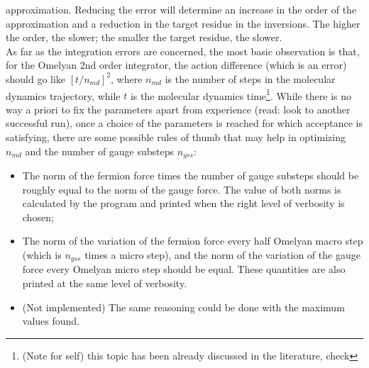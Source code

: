 approximation. 
Reducing the error will determine an increase in the order of the approximation 
and a 
reduction in the target residue in the inversions. The higher the order, the 
slower; 
the smaller the target residue, the slower. \\
As far as the integration errors are concerned, the most basic observation is 
that, for 
the Omelyan 2nd order integrator, the action difference (which is an error) 
should go 
like $[t/n_{md}]^2$, where $n_{md}$ is the number of steps in the molecular 
dynamics 
trajectory, while $t$ is the molecular dynamics time\footnote{(Note for self) 
this topic has been already discussed in 
    the 
literature, check}. While there is no way a priori to fix the parameters apart 
from 
experience (read: look to another successful run), once a choice of the 
parameters is 
reached for which acceptance is satisfying, there are some possible rules of 
thumb that 
may help in optimizing $n_{md}$ and the number of gauge substeps $n_{gss}$:
\begin{itemize}
    \item The norm of the fermion force times the number of gauge substeps should 
        be 
        roughly equal to the norm of the gauge force. The value of both norms is 
        calculated by 
        the program and printed when the right level of verbosity is chosen;
    \item The norm of the variation of the fermion force every half Omelyan macro 
        step 
        (which is $n_{gss}$ times a micro step), and the norm of the variation of the 
        gauge 
        force every Omelyan micro step should be equal. These quantities are also 
        printed at 
        the same level of verbosity.
    \item (Not implemented) The same reasoning could be done with the maximum values 
        found.
\end{itemize}









